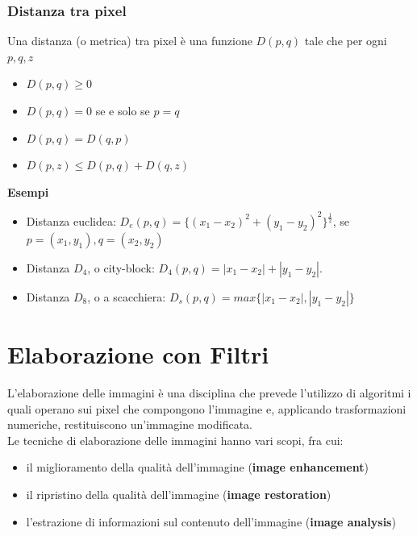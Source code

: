 \subsection{Distanza tra pixel}

Una distanza (o metrica) tra pixel è una funzione $D(p, q)$ tale che per ogni
$p, q, z$

\begin{itemize}
    \item $D(p, q) \ge 0$
    \item $D(p, q) = 0$ se e solo se $p = q$
    \item $D(p, q) = D(q, p)$
    \item $D(p, z) \le D(p, q) + D(q, z)$
\end{itemize}

\textbf{Esempi}

\begin{itemize}
    \item Distanza euclidea: $D_e(p, q) = \{(x_1 - x_2)^2 + (y_1 -
              y_2)^2\}^{\frac{1}{2}}$, se $p = (x_1, y_1), q=(x_2, y_2)$
    \item Distanza $D_4$, o city-block: $D_4(p, q) = |x_1 - x_2| + |y_1 - y_2|$.
    \item Distanza $D_8$, o a scacchiera: $D_s(p,q) = max\{|x_1 - x_2|, |y_1 -
              y_2|\}$
\end{itemize}

\chapter{Elaborazione con Filtri}

L'elaborazione delle immagini è una disciplina che prevede l'utilizzo di
algoritmi i quali operano sui pixel che compongono l'immagine e, applicando
trasformazioni numeriche, restituiscono un'immagine modificata.\\
Le tecniche di elaborazione delle immagini hanno vari scopi, fra cui:

\begin{itemize}
    \item il miglioramento della qualità dell'immagine (\textbf{image
              enhancement})
    \item il ripristino della qualità dell'immagine (\textbf{image restoration})
    \item l'estrazione di informazioni sul contenuto dell'immagine
          (\textbf{image analysis})
\end{itemize}

